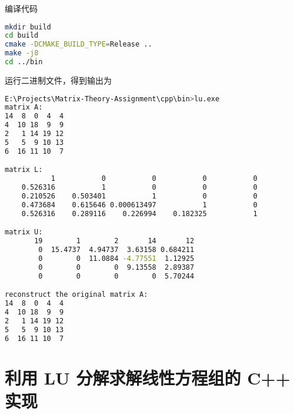 编译代码
\begin{lstlisting}[language=bash]
mkdir build
cd build
cmake -DCMAKE_BUILD_TYPE=Release ..
make -j8
cd ../bin
\end{lstlisting}
运行二进制文件，得到输出为
\begin{lstlisting}[language=bash]
E:\Projects\Matrix-Theory-Assignment\cpp\bin>lu.exe
matrix A:
14  8  0  4  4
4  10 18  9  9
2   1 14 19 12
5   5  9 10 13
6  16 11 10  7

matrix L:
           1           0           0           0           0
    0.526316           1           0           0           0
    0.210526    0.503401           1           0           0
    0.473684    0.615646 0.000613497           1           0
    0.526316    0.289116    0.226994    0.182325           1

matrix U:
       19        1        2       14       12
        0  15.4737  4.94737  3.63158 0.684211
        0        0  11.0884 -4.77551  1.12925
        0        0        0  9.13558  2.89387
        0        0        0        0  5.70244

reconstruct the original matrix A:
14  8  0  4  4
4  10 18  9  9
2   1 14 19 12
5   5  9 10 13
6  16 11 10  7
\end{lstlisting}
\section{利用 LU 分解求解线性方程组的 C++ 实现}
